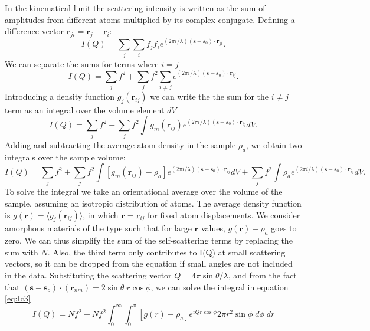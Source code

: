 In the kinematical limit the scattering intensity is written as the sum of amplitudes from different atoms multiplied by its complex conjugate. Defining a difference vector $\textbf{r}_{ji} = \textbf{r}_{j} - \textbf{r}_{i}$:
\begin{equation}\label{eq:ScatI}
I(Q) = \sum_{j}\sum_{i} f_{j}f_{i} e^{(2\pi i/\lambda) (\textbf{s}-\textbf{s}_{0}) \cdot \textbf{r}_{ji}}.
\end{equation}
We can separate the sums for terms where $i=j$
\begin{equation}\label{eq:Ic1}
I(Q) = \sum_{j}f^{2}+ \sum_{j}f^{2}\sum_{i\neq j} e^{(2\pi i/\lambda) (\textbf{s}-\textbf{s}_{0}) \cdot \textbf{r}_{ij}}.
\end{equation}
Introducing a density function $g_{j}(\textbf{r}_{ij})$ we can write the the sum for the $i\neq j$ term as an integral over the volume element $dV$
\begin{equation}\label{eq:Ic2}
I(Q) = \sum_{j}f^{2}+ \sum_{j}f^{2}\int g_{m}(\textbf{r}_{ij})e^{(2\pi i/\lambda) (\textbf{s}-\textbf{s}_{0}) \cdot \textbf{r}_{ij}}dV.
\end{equation}
Adding and subtracting the average atom density in the sample $\rho_{a}$, we obtain two integrals over the sample volume:
\begin{equation}\label{eq:Ic3}
I(Q) = \sum_{j}f^{2}+ \sum_{j}f^{2}\int [g_{m}(\textbf{r}_{ij})-\rho_{a}]e^{(2\pi i/\lambda) (\textbf{s}-\textbf{s}_{0}) \cdot \textbf{r}_{ij}}dV + \sum_{j}f^{2}\int \rho_{a}e^{(2\pi i/\lambda) (\textbf{s}-\textbf{s}_{0}) \cdot \textbf{r}_{ij}}dV.
\end{equation}
To solve the integral we take an orientational average over the volume of the sample, assuming an isotropic distribution of atoms. The average density function is $g(\textbf{r}) = \langle g_{j}(\textbf{r}_{ij})\rangle$, in which $\textbf{r} = \textbf{r}_{ij}$ for fixed atom displacements. We consider amorphous materials of the type such that for large $\textbf{r}$ values, $g(\textbf{r}) - \rho_{a}$ goes to zero. We can thus simplify the sum of the self-scattering terms by replacing the sum with $N$. Also, the third term only contributes to I(Q) at small scattering vectors, so it can be dropped from the equation if small angles are not included in the data. Substituting the scattering vector $Q = 4\pi \sin{\theta/\lambda}$, and from the fact that 
$(\textbf{s} - \textbf{s}_{o})\cdot(\textbf{r}_{nm}) = 2\sin{\theta}\;r\cos{\phi}$, we can solve the integral in equation \ref{eq:Ic3}
\begin{equation}\label{eq:Ic4}
I(Q) = Nf^{2}+ Nf^{2}\int^{\infty}_{0}\int^{\pi}_{0}[g(r)-\rho_{a}] e^{iQr\cos{\phi}}2\pi r^{2} \sin{\phi}\;d\phi\;dr
\end{equation}

